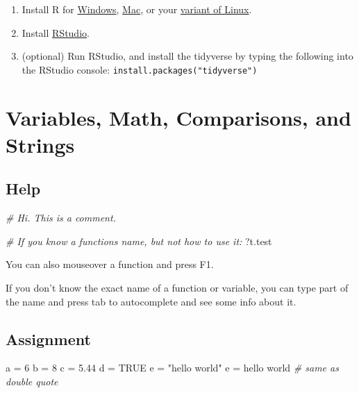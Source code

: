 \documentclass[
]{book}
\newenvironment{Shaded}{\begin{snugshade}}{\end{snugshade}}
\newcommand{\CommentTok}[1]{\textcolor[rgb]{0.56,0.35,0.01}{\textit{#1}}}
\newcommand{\ConstantTok}[1]{\textcolor[rgb]{0.00,0.00,0.00}{#1}}
\newcommand{\DecValTok}[1]{\textcolor[rgb]{0.00,0.00,0.81}{#1}}
\newcommand{\FloatTok}[1]{\textcolor[rgb]{0.00,0.00,0.81}{#1}}
\newcommand{\NormalTok}[1]{#1}
\newcommand{\OtherTok}[1]{\textcolor[rgb]{0.56,0.35,0.01}{#1}}
\newcommand{\StringTok}[1]{\textcolor[rgb]{0.31,0.60,0.02}{#1}}
\providecommand{\tightlist}{%
  \setlength{\itemsep}{0pt}\setlength{\parskip}{0pt}}
\begin{document}
\begin{enumerate}
\def\labelenumi{\arabic{enumi}.}
\tightlist
\item
  Install R for \href{https://cloud.r-project.org/bin/windows/base/}{Windows}, \href{https://cloud.r-project.org/bin/macosx/}{Mac}, or your \href{https://cloud.r-project.org/bin/linux/}{variant of Linux}.
\item
  Install \href{https://www.rstudio.com/products/rstudio/}{RStudio}.
\item
  (optional) Run RStudio, and install the tidyverse by typing the following into the RStudio console: \texttt{install.packages("tidyverse")}
\end{enumerate}

\hypertarget{variables-math-comparisons-and-strings}{%
\chapter{Variables, Math, Comparisons, and Strings}\label{variables-math-comparisons-and-strings}}

\hypertarget{help}{%
\section{Help}\label{help}}

\begin{Shaded}
\begin{Highlighting}[]
\CommentTok{\# Hi. This is a comment.}

\CommentTok{\# If you know a function\textquotesingle{}s name, but not how to use it:}
\NormalTok{?t.test}
\end{Highlighting}
\end{Shaded}

You can also mouseover a function and press F1.

If you don't know the exact name of a function or variable, you can type part of the name and press tab to autocomplete and see some info about it.

\hypertarget{assignment}{%
\section{Assignment}\label{assignment}}

\begin{Shaded}
\begin{Highlighting}[]
\NormalTok{a }\OtherTok{=} \DecValTok{6}
\NormalTok{b }\OtherTok{=} \DecValTok{8}
\NormalTok{c }\OtherTok{=} \FloatTok{5.44}
\NormalTok{d }\OtherTok{=} \ConstantTok{TRUE}
\NormalTok{e }\OtherTok{=} \StringTok{"hello world"} 
\NormalTok{e }\OtherTok{=} \StringTok{\textquotesingle{}hello world\textquotesingle{}} \CommentTok{\# same as double quote}
\end{Highlighting}
\end{Shaded}
\end{document}
